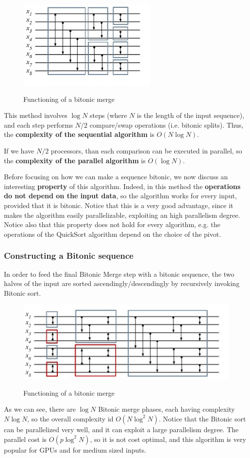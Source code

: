\begin{figure}[h!]
		\centering
		\includegraphics[scale = 2.0]{img/bitonic merge.jpg}
        \label{bitonic merge}
        \caption{Functioning of a bitonic merge}
\end{figure}

This method involves $\log N$ steps (where $N$ is the length of the input sequence), and each step performs $N/2$ compare/swap operations (i.e. bitonic splits). Thus, the \textbf{complexity of the sequential algorithm} is $O(N \log N)$.

If we have $N/2$ processors, than each comparison can be executed in parallel, so the \textbf{complexity of the parallel algorithm} is $O(\log N)$.

Before focusing on how we can make a sequence bitonic, we now discuss an interesting \textbf{property} of this algorithm. Indeed, in this method the \textbf{operations do not depend on the input data}, so the algorithm works for every input, provided that it is bitonic. Notice that this is a very good advantage, since it makes the algorithm easily parallelizable, exploiting an high parallelism degree. Notice also that this property does not hold for every algorithm, e.g. the operations of the QuickSort algorithm depend on the choice of the pivot.

\subsubsection{Constructing a Bitonic sequence}
In order to feed the final Bitonic Merge step with a bitonic sequence, the two halves of the input are sorted ascendingly/descendingly by recursively invoking Bitonic sort. 

\begin{figure}[h!]
		\centering
		\includegraphics[scale = 2.0]{img/bitonic sort.jpg}
        \label{bitonic sort}
        \caption{Functioning of a bitonic merge}
\end{figure}

As we can see, there are $\log N$ Bitonic merge phases, each having complexity $N \log N$, so the overall complexity id $O(N \log^2 N)$. Notice that the Bitonic sort can be parallelized very well, and it can exploit a large parallelism degree. The parallel cost is $O(p \log^2 N)$, so it is not cost optimal, and this algorithm is very popular for GPUs and for medium sized inputs.
